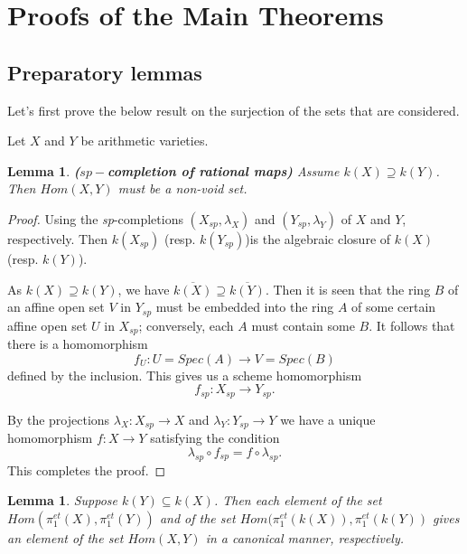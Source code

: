 \documentclass[12pt,twoside,reqno]{amsart}
\newtheorem{lemma}[theorem]{Lemma}
\theoremstyle{definition}
\numberwithin{equation}{section}
\begin{document}
\section{Proofs of the Main Theorems}

\subsection{Preparatory lemmas}

Let's first prove the below result on the surjection of the sets that are considered.

Let $X$ and $Y$ be arithmetic varieties.

\begin{lemma}
\emph{\textbf{($sp-$completion of rational maps)}} Assume $k(X)\supseteq k(Y)$. Then
$Hom(X,Y)$ must be a non-void set.
\end{lemma}

\begin{proof}
Using the \emph{sp}-completions $(X_{sp},\lambda_{X})$ and $(Y_{sp},\lambda_{Y})$ of $X$ and $Y$, respectively.  Then $k(X_{sp})$ (resp. $k(Y_{sp})$)is the algebraic closure of $k(X)$ (resp. $k(Y)$).

As $k(X)\supseteq k(Y)$, we have $\overline{k(X)}\supseteq \overline{k(Y)}$. Then it is seen that the ring $B$ of an affine open set $V$ in $Y_{sp}$ must be embedded into the ring $A $ of some certain affine open set $U$ in $X_{sp}$; conversely, each $A$ must contain some $B$. It follows that there is a homomorphism $$f_{U}:U=Spec(A)\to V=Spec(B)$$ defined by the inclusion. This gives us a scheme homomorphism $$f_{sp}:X_{sp}\to Y_{sp}.$$

By the projections $\lambda_{X}:X_{sp}\to X$ and $\lambda_{Y}:Y_{sp}\to Y$ we have a unique homomorphism $f:X \to Y$ satisfying the condition $$\lambda_{sp}\circ f_{sp}=f \circ \lambda_{sp}.$$
This completes the proof.
\end{proof}

\begin{lemma}
 Suppose $k\left( Y\right) \subseteq k\left( X\right)$. Then  each element of the set $Hom(\pi_{1}^{et}(X),\pi_{1}^{et}(Y))$ and of the set $Hom(\pi_{1}^{et}(k(X)),\pi_{1}^{et}(k(Y))$ gives an element of the set $Hom (X,Y)$ in a canonical manner, respectively.
\end{lemma}
\end{document}
